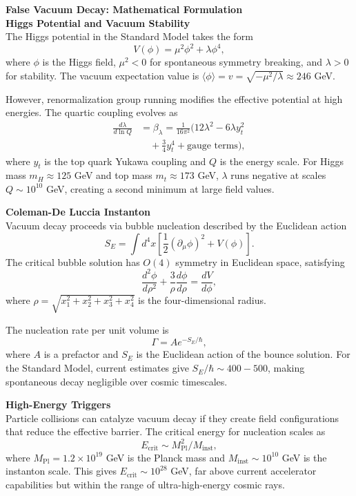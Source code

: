 \begin{technical}
{\Large\textbf{False Vacuum Decay: Mathematical Formulation}}\\[0.7em]

\textbf{Higgs Potential and Vacuum Stability}\\[0.5em]
The Higgs potential in the Standard Model takes the form
$$
V(\phi) = \mu^2 \phi^2 + \lambda \phi^4,
$$
where $\phi$ is the Higgs field, $\mu^2 < 0$ for spontaneous symmetry breaking, and $\lambda > 0$ for stability. The vacuum expectation value is $\langle \phi \rangle = v = \sqrt{-\mu^2/\lambda} \approx 246$ GeV.

However, renormalization group running modifies the effective potential at high energies. The quartic coupling evolves as
\begin{align}
\frac{d\lambda}{d\ln Q} &= \beta_\lambda = \frac{1}{16\pi^2}\Big(12\lambda^2 - 6\lambda y_t^2 \\
&\quad + \frac{3}{4}y_t^4 + \text{gauge terms}\Big),
\end{align}
where $y_t$ is the top quark Yukawa coupling and $Q$ is the energy scale. For Higgs mass $m_H \approx 125$ GeV and top mass $m_t \approx 173$ GeV, $\lambda$ runs negative at scales $Q \sim 10^{10}$ GeV, creating a second minimum at large field values.

\textbf{Coleman-De Luccia Instanton}\\[0.5em]
Vacuum decay proceeds via bubble nucleation described by the Euclidean action
$$
S_E = \int d^4x \left[\frac{1}{2}(\partial_\mu \phi)^2 + V(\phi)\right].
$$
The critical bubble solution has $O(4)$ symmetry in Euclidean space, satisfying
$$
\frac{d^2\phi}{d\rho^2} + \frac{3}{\rho}\frac{d\phi}{d\rho} = \frac{dV}{d\phi},
$$
where $\rho = \sqrt{x_1^2 + x_2^2 + x_3^2 + x_4^2}$ is the four-dimensional radius.

The nucleation rate per unit volume is
$$
\Gamma = A e^{-S_E/\hbar},
$$
where $A$ is a prefactor and $S_E$ is the Euclidean action of the bounce solution. For the Standard Model, current estimates give $S_E/\hbar \sim 400-500$, making spontaneous decay negligible over cosmic timescales.

\textbf{High-Energy Triggers}\\[0.5em]
Particle collisions can catalyze vacuum decay if they create field configurations that reduce the effective barrier. The critical energy for nucleation scales as
$$
E_{\text{crit}} \sim M_{\text{Pl}}^2/M_{\text{inst}},
$$
where $M_{\text{Pl}} = 1.2 \times 10^{19}$ GeV is the Planck mass and $M_{\text{inst}} \sim 10^{10}$ GeV is the instanton scale. This gives $E_{\text{crit}} \sim 10^{28}$ GeV, far above current accelerator capabilities but within the range of ultra-high-energy cosmic rays.


\end{technical}

